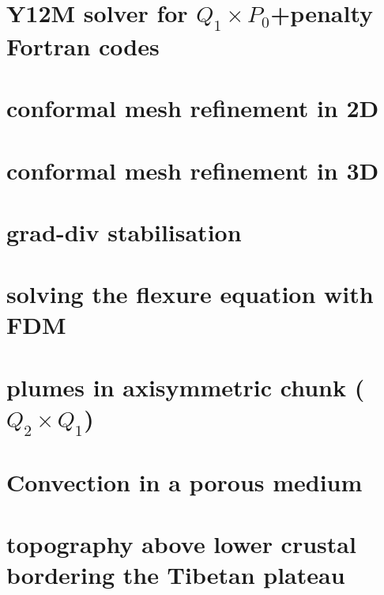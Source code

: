 \documentclass[a4paper,11pt]{report}
\begin{document}
\chapter{Y12M solver for $Q_1\times P_0$+penalty Fortran codes \label{f101}}

\chapter{conformal mesh refinement in 2D \label{f102}}

\chapter{conformal mesh refinement in 3D \label{f103}}

\chapter{grad-div stabilisation  \label{f104}}

\chapter{solving the flexure equation with FDM  \label{f105}}

\chapter{plumes in axisymmetric chunk ($Q_2\times Q_1$)  \label{f106}}

\chapter{Convection in a porous medium  \label{f107}}

\chapter{topography above lower crustal bordering the Tibetan plateau \label{f108}}
\end{document}
